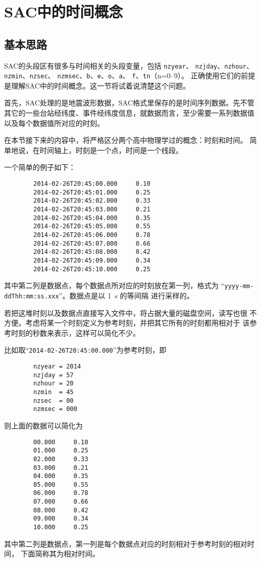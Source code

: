 \section{SAC中的时间概念}
\label{sec:sac-time}

\subsection{基本思路}
SAC的头段区有很多与时间相关的头段变量，包括 \texttt{nzyear}、
\texttt{nzjday}、\texttt{nzhour}、\texttt{nzmin}、\texttt{nzsec}、
\texttt{nzmsec}、\texttt{b}、\texttt{e}、\texttt{o}、\texttt{a}、
\texttt{f}、\texttt{tn}（n=0--9）。
正确使用它们的前提是理解SAC中的时间概念。这一节将试着说清楚这个问题。

首先，SAC处理的是地震波形数据，SAC格式里保存的是时间序列数据。先不管
其它的一些台站经纬度、事件经纬度信息，就数据而言，至少需要一系列数据值
以及每个数据值所对应的时刻。

在本节接下来的内容中，将严格区分两个高中物理学过的概念：时刻和时间。
简单地说，在时间轴上，时刻是一个点，时间是一个线段。

一个简单的例子如下：
\begin{verbatim}
        2014-02-26T20:45:00.000     0.10
        2014-02-26T20:45:01.000     0.25
        2014-02-26T20:45:02.000     0.33
        2014-02-26T20:45:03.000     0.21
        2014-02-26T20:45:04.000     0.35
        2014-02-26T20:45:05.000     0.55
        2014-02-26T20:45:06.000     0.78
        2014-02-26T20:45:07.000     0.66
        2014-02-26T20:45:08.000     0.42
        2014-02-26T20:45:09.000     0.34
        2014-02-26T20:45:10.000     0.25
\end{verbatim}
其中第二列是数据点，每个数据点所对应的时刻放在第一列，格式为
``\texttt{yyyy-mm-ddThh:mm:ss.xxx}''。数据点是以 \SI{1}{\s} 的等间隔
进行采样的。

若把这堆时刻以及数据点直接写入文件中，将占据大量的磁盘空间，读写也很
不方便。考虑将某一个时刻定义为参考时刻，并把其它所有的时刻都用相对于
该参考时刻的秒数来表示，这样可以简化不少。

比如取``\texttt{2014-02-26T20:45:00.000}''为参考时刻，即
\begin{verbatim}
        nzyear = 2014
        nzjday = 57
        nzhour = 20
        nzmin  = 45
        nzsec  = 00
        nzmsec = 000
\end{verbatim}
则上面的数据可以简化为
\begin{verbatim}
        00.000     0.10
        01.000     0.25
        02.000     0.33
        03.000     0.21
        04.000     0.35
        05.000     0.55
        06.000     0.78
        07.000     0.66
        08.000     0.42
        09.000     0.34
        10.000     0.25
\end{verbatim}
其中第二列是数据点，第一列是每个数据点对应的时刻相对于参考时刻的相对时间，
下面简称其为相对时间。


